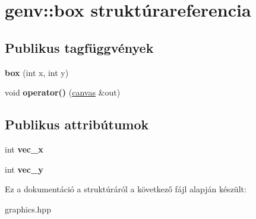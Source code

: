 \hypertarget{structgenv_1_1box}{}\section{genv\+:\+:box struktúrareferencia}
\label{structgenv_1_1box}
\subsection*{Publikus tagfüggvények}
\begin{DoxyCompactItemize}
\item 
\mbox{\label{structgenv_1_1box_af3503beee95ae0b5fa4a33fcdd75a0b5}} 
{\bfseries box} (int x, int y)
\item 
\mbox{\label{structgenv_1_1box_aa370a72cc0844a0dcb18efd335dc2c72}} 
void {\bfseries operator()} (\hyperlink{classgenv_1_1canvas}{canvas} \&out)
\end{DoxyCompactItemize}
\subsection*{Publikus attribútumok}
\begin{DoxyCompactItemize}
\item 
\mbox{\label{structgenv_1_1box_af28b87b7187c6d544168b96201ea31f6}} 
int {\bfseries vec\+\_\+x}
\item 
\mbox{\label{structgenv_1_1box_a7d0c1be9618a7b76b3b411d0501275cb}} 
int {\bfseries vec\+\_\+y}
\end{DoxyCompactItemize}


Ez a dokumentáció a struktúráról a következő fájl alapján készült\+:\begin{DoxyCompactItemize}
\item 
graphics.\+hpp\end{DoxyCompactItemize}
